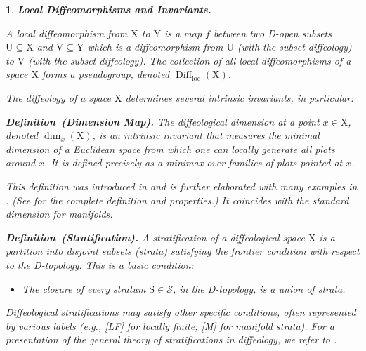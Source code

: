 \documentclass[10pt,reqno,letterpaper,twoside]{amsart}
\theoremstyle{article}
\newtheorem{article}{}
\def\artlabel[#1]{\textbf{#1.}}
\newenvironment{definition}[1]%
{\noindent\textbf{Definition#1.} \it}%
{}
\newcommand{\cS}{{\mathcal S}}
\def \S{\mathrm S}
\def \U{\mathrm U}
\def \V{\mathrm V}
\def \X{\mathrm X}
\def \Y{\mathrm Y}
\DeclareMathOperator{\Diff}{Diff}
\newcommand{\loc}{\mathrm{loc}}
\begin{document}
  \begin{article}
    \artlabel[Local Diffeomorphisms and Invariants]
    \label{Local_Diffeomorphisms_and_Invariants}
    
    
    A \emph{local diffeomorphism} from $\X$ to $\Y$ is a map $f$ between two D-open subsets $\U \subseteq \X$ and $\V \subseteq \Y$ which is a diffeomorphism from $\U$ (with the subset diffeology) to $\V$ (with the subset diffeology).
    The collection of all local diffeomorphisms of a space $\X$ forms a pseudogroup,
    denoted $\Diff_\loc(\X)$.
    
    The diffeology of a space $\X$ determines several intrinsic invariants,
    in particular:
    
    \begin{definition}{~(Dimension Map)}
      \label{def:Dimension_Map}
      The \emph{diffeological dimension} at a point $x \in \X$,
      denoted $\dim_x(\X)$,
      is an intrinsic invariant that measures the minimal dimension of a Euclidean space from which one can locally generate all plots around $x$.
      It is defined precisely as a minimax over families of plots pointed at $x$.
    \end{definition}
    
    This definition was introduced in \cite{PIZ07} and is further elaborated with many examples in \cite{PIZ13}.
    (See \cite[Chapter 2]{PIZ13} for the complete definition and properties.)
    It coincides with the standard dimension for manifolds.
    
    \begin{definition}{~(Stratification)}
      \label{def:Stratification}
      A \emph{stratification} of a diffeological space $\X$ is a partition into disjoint subsets (strata) satisfying the \emph{frontier condition} with respect to the D-topology.
      This is a \emph{basic} condition:
      \begin{itemize}
        \item[{[B]}] The closure of every stratum $\S \in \cS$,
        in the D-topology,
        is a union of strata.
      \end{itemize}
    \end{definition}
    
    Diffeological stratifications may satisfy other specific conditions,
    often represented by various labels (e.g., [LF] for locally finite, [M] for manifold strata).
    For a presentation of the general theory of stratifications in diffeology,
    we refer to \cite{GIZ23}.
    

\end{article}
\end{document}
